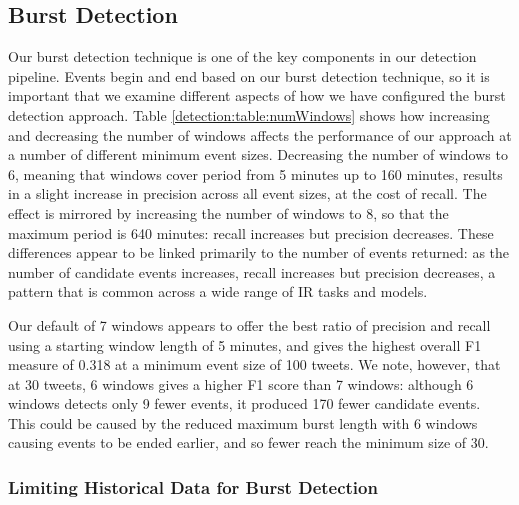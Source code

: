 \subsection{Burst Detection}
Our burst detection technique is one of the key components in our detection pipeline.
Events begin and end based on our burst detection technique, so it is important that we examine different aspects of how we have configured the burst detection approach.
Table \ref{detection:table:numWindows} shows how increasing and decreasing the number of windows affects the performance of our approach at a number of different minimum event sizes.
Decreasing the number of windows to 6, meaning that windows cover period from 5 minutes up to 160 minutes, results in a slight increase in precision across all event sizes, at the cost of recall.
The effect is mirrored by increasing the number of windows to 8, so that the maximum period is 640 minutes: recall increases but precision decreases.
These differences appear to be linked primarily to the number of events returned: as the number of candidate events increases, recall increases but precision decreases, a pattern that is common across a wide range of IR tasks and models.

Our default of 7 windows appears to offer the best ratio of precision and recall using a starting window length of 5 minutes, and gives the highest overall F1 measure of 0.318 at a minimum event size of 100 tweets.
We note, however, that at 30 tweets, 6 windows gives a higher F1 score than 7 windows: although 6 windows detects only 9 fewer events, it produced 170 fewer candidate events.
This could be caused by the reduced maximum burst length with 6 windows causing events to be ended earlier, and so fewer reach the minimum size of 30.



\subsubsection{Limiting Historical Data for Burst Detection}

